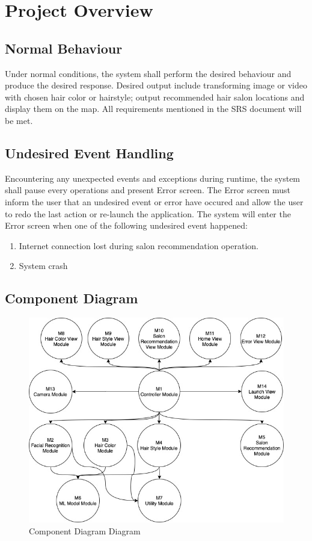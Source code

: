 \documentclass[12pt, titlepage]{article}
\begin{document}
\section{Project Overview}

\subsection{Normal Behaviour}
Under normal conditions, the system shall perform the desired behaviour and produce the desired response. Desired output include transforming image or video with chosen hair color or hairstyle; output recommended hair salon locations and display them on the map. All requirements mentioned in the SRS document will be met.

\subsection{Undesired Event Handling}
Encountering any unexpected events and exceptions during runtime, the system shall pause every operations and present Error screen. The Error screen must inform the user that an undesired event or error have occured and allow the user to redo the last action or re-launch the application. The system will enter the Error screen when one of the following undesired event happened:
\begin{enumerate}
    \item Internet connection lost during salon recommendation operation.
    \item System crash
\end{enumerate}

\subsection{Component Diagram}

\begin{center}
\begin{figure}[H]
\includegraphics[width=1\textwidth]{Design/SystDesign/component_diagram.jpg}
\caption{Component Diagram Diagram}
\label{Fig_SystemContext} 
\end{figure}
\end{center}
\end{document}
